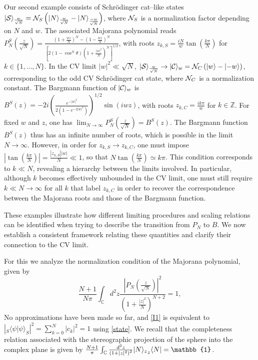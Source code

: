 \documentclass[aps,prl,showpacs,twocolumn]{revtex4-2}
\providecommand{\abs}[1]{\left\lvert#1\right\rvert}
\providecommand{\bra}[1]{\langle #1 \rvert}
\providecommand{\ket}[1]{\lvert #1 \rangle}
\providecommand{\abs}[1]{\left\lvert#1\right\rvert}
\providecommand{\bra}[1]{\langle #1 \rvert}
\providecommand{\ket}[1]{\lvert #1 \rangle}
\providecommand{\abs}[1]{\left\lvert#1\right\rvert}
\providecommand{\bra}[1]{\langle #1 \rvert}
\providecommand{\ket}[1]{\lvert #1 \rangle}
\providecommand{\abs}[1]{\left\lvert#1\right\rvert}
\providecommand{\bra}[1]{\langle #1 \rvert}
\providecommand{\ket}[1]{\lvert #1 \rangle}
\begin{document}
Our second example consists of Schr\"odinger cat--like states
$\ket{{\cal S}}_{\frac{w}{\sqrt{N}}} = {\cal N}_S \left( \ket{N}_{\frac{w}{\sqrt{N}}} - \ket{N}_{\frac{-w}{\sqrt{N}}} \right)$,
where ${\cal N}_S$ is a normalization factor depending on $N$ and $w$.
The associated Majorana polynomial reads
$P_N^S\!\left(\frac{z}{\sqrt{N}}\right) = \frac{\left(1+\frac{w z}{N}\right)^N - \left(1-\frac{w z}{N}\right)^N}{\left[ 2 \left(1-\cos^N{\theta}\right) \left(1+\frac{|w|^2}{N}\right)^N \right]^{1/2}}$,
with roots $z_{k,S} = \frac{iN}{w}\tan\!\left(\frac{k \pi}{N}\right)$ for $k \in \{1,\ldots,N\}$. In the CV limit $\abs{w}^2 \ll \sqrt{N}$, $\ket{{\cal S}}_{\frac{w}{\sqrt{N}}} \to \ket{{\cal C}}_w = {\cal N}_C \left( \ket{w} - \ket{-w} \right)$, corresponding to the odd CV Schr\"odinger cat state, where ${\cal N}_C$ is a normalization constant.
The Bargmann function of $\ket{{\cal C}}_w$ is $B^S(z) = -2i \left( \frac{e^{-|w|^2}}{2(1-e^{-2|w|^2})} \right)^{1/2}\sin\!\left(i w z\right)$,
with roots $z_{k,C} = \frac{i k \pi}{w}$ for $k \in \mathbb{Z}$.
For fixed $w$ and $z$, one has $\lim_{N\to \infty} P_N^S\!\left(\frac{z}{\sqrt{N}}\right) = B^S(z)$. The Bargmann function $B^S(z)$ thus has an infinite number of roots, which is possible in the limit $N \to \infty$.
However, in order for $z_{k,S} \to z_{k,C}$, one must impose $\left|\tan\!\left(\frac{k \pi}{N}\right)\right| = \frac{|z_{k,S}||w|}{N} \ll 1$,
so that $N \tan\!\left(\frac{k \pi}{N}\right) \simeq k \pi$.
This condition corresponds to $k \ll N$, revealing a hierarchy between the limits involved.
In particular, although $k$ becomes effectively unbounded in the CV limit, one must still require $k \ll N \to \infty$ for all $k$ that label $z_{k,C}$ in order to recover the correspondence between the Majorana roots and those of the Bargmann function.

These examples illustrate how different limiting procedures and scaling relations can be identified when trying to describe the transition from $P_N$ to $B$.
We now establish a consistent framework relating these quantities and clarify their connection to the CV limit.




For this we analyze the normalization condition of the Majorana polynomial, given by
\begin{equation}\label{I1}
\frac{N+1}{N\pi}\int_{\mathbb{C}} d^2 z \frac{\abs{P_N\left (\frac{z}{\sqrt{N}}\right )}^2}{\left (1+\frac{|z|^2}{N}\right )^{N+2}}=1,
\end{equation}
No approximations have been made so far, and \eqref{I1} is equivalent to $\abs{{}_S\langle \psi | \psi \rangle_S}^2=\sum_{k=0}^N \abs{c_k}^2 = 1$ using \eqref{state}. We recall that the completeness relation associated with the stereographic projection of the sphere into the complex plane is given by $\frac{N+1}{\pi}\int_{\mathbb{C}} \frac{d^2 z}{\left (1+|z|^2\right )^2}\ket{N}_{z}\!\prescript{}{z}{\bra{N}}=\mathbb{1}$.
\end{document}
